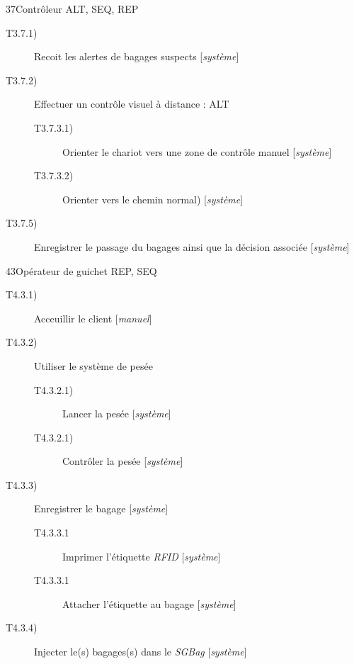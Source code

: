 \dta
{3}{7}{Contrôleur}
{ALT, SEQ, REP}
{
\begin{description}
	\item [T3.7.1)] Recoit les alertes de bagages suspects [\textsl{système}]
	\item [T3.7.2)] Effectuer un contrôle visuel à distance : ALT
	\begin{description}
		\item [T3.7.3.1)] Orienter le chariot vers une zone de contrôle manuel [\textsl{système}]
		\item [T3.7.3.2)] Orienter vers le chemin \og normal\fg) [\textsl{système}]
	\end{description}
	\item [T3.7.5)] Enregistrer le passage du bagages ainsi que la décision associée [\textsl{système}]
\end{description}
}

\hspace{1cm}

\dta
{4}{3}{Opérateur de guichet}
{REP, SEQ}
{
\begin{description}
	\item [T4.3.1)] Acceuillir le client [\textsl{manuel}]
	\item [T4.3.2)] Utiliser le système de pesée
	\begin{description}
		\item [T4.3.2.1)] Lancer la pesée [\textsl{système}]
		\item [T4.3.2.1)] Contrôler la pesée [\textsl{système}]
	\end{description}
	\item [T4.3.3)] Enregistrer le bagage [\textsl{système}]
	\begin{description}
		\item [T4.3.3.1] Imprimer l'étiquette \textsl{RFID} [\textsl{système}]
		\item [T4.3.3.1] Attacher l'étiquette au bagage [\textsl{système}]
	\end{description}
	\item [T4.3.4)] Injecter le(s) bagages(s) dans le \textsl{SGBag}  [\textsl{système}]
\end{description}
}

\hspace{1cm}

